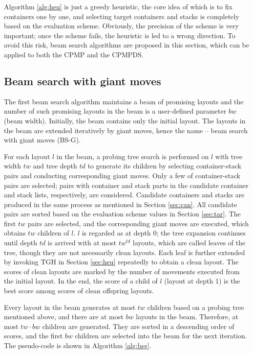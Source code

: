 \documentclass[review,3p,times,authoryear,12pt]{elsarticle}
\begin{document}
Algorithm \ref{alg:heu} is just a greedy heuristic, the core idea of which is to fix containers one by one, and selecting target containers and stacks is completely based on the evaluation scheme.
Obviously, the precision of the scheme is very important; once the scheme fails, the heuristic is led to a wrong direction.
To avoid this risk, beam search algorithms are proposed in this section, which can be applied to both the CPMP and the CPMPDS.

\subsection{Beam search with giant moves}

The first beam search algorithm maintains a beam of promising layouts and the number of such promising layouts in the beam is a user-defined parameter $\mathit{bw}$ (beam width).
Initially, the beam contains only the initial layout.
The layouts in the beam are extended iteratively by giant moves, hence the name -- beam search with giant moves (BS-G).

For each layout $l$ in the beam, a probing tree search is performed on $l$ with tree width $\mathit{tw}$ and tree depth $\mathit{td}$ to generate its children by selecting container-stack pairs and conducting corresponding giant moves.
Only a few of container-stack pairs are selected; pairs with container and stack parts in the candidate container and stack lists, respectively, are considered.
Candidate containers and stacks are produced in the same process as mentioned in Section \ref{sec:can}.
All candidate pairs are sorted based on the evaluation scheme values in Section \ref{sec:tar}.
The first $\mathit{tw}$ pairs are selected, and the corresponding giant moves are executed, which obtains $\mathit{tw}$ children of $l$.
$l$ is regarded as at depth 0; the tree expansion continues until depth $\mathit{td}$ is arrived with at most $\mathit{tw}^\mathit{td}$ layouts, which are called leaves of the tree, though they are not necessarily clean layouts.
Each leaf is further extended by invoking TGH in Section \ref{sec:heu} repeatedly to obtain a clean layout.
The scores of clean layouts are marked by the number of movements executed from the initial layout.
In the end, the score of a child of $l$ (layout at depth 1) is the best score among scores of clean offspring layouts.

Every layout in the beam generates at most $\mathit{tw}$ children based on a probing tree mentioned above, and there are at most $\mathit{bw}$ layouts in the beam.
Therefore, at most $\mathit{tw}\cdot \mathit{bw}$ children are generated.
They are sorted in a descending order of scores, and the first $\mathit{bw}$ children are selected into the beam for the next iteration.
The pseudo-code is shown in Algorithm \ref{alg:bsg}.
\end{document}
